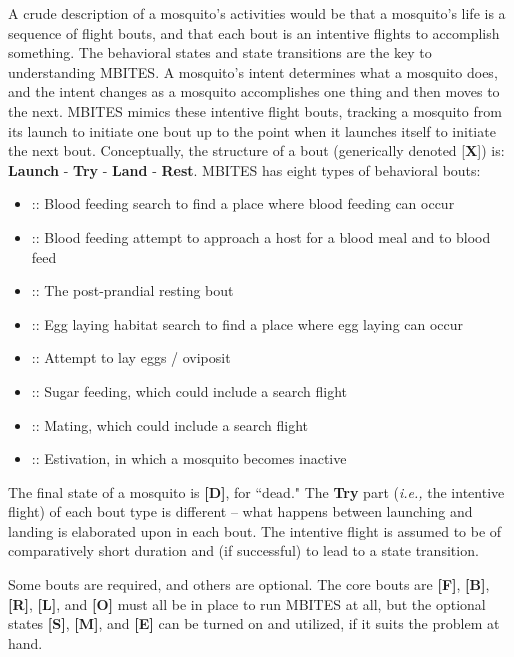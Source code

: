 \documentclass{article}
\newcommand{\ie}{{\em i.e., }}
\newcommand{\Bbout}{{\bf [B]}}
\newcommand{\Fbout}{{\bf [F]}}
\newcommand{\Rbout}{{\bf [R]}}
\newcommand{\Lbout}{{\bf [L]}}
\newcommand{\Obout}{{\bf [O]}}
\newcommand{\Sbout}{{\bf [S]}}
\newcommand{\Mbout}{{\bf [M]}}
\newcommand{\Ebout}{{\bf [E]}}
\newcommand{\Dead}{{\bf [D]}}
\begin{document}
A crude description of a mosquito's activities would be that a mosquito's life is a sequence of flight bouts, and that each bout is an intentive flights to accomplish something. The behavioral states and state transitions are the key to understanding MBITES. A mosquito's intent determines what a mosquito does, and the intent changes as a mosquito accomplishes one thing and then moves to the next. MBITES mimics these intentive flight bouts, tracking a  mosquito from its launch to initiate one bout up to the point when it launches itself to initiate the next bout. Conceptually, the structure of a bout (generically denoted [{\bf X}]) is:  {\bf Launch} - {\bf Try} - {\bf Land} - {\bf Rest}. MBITES has  eight types of behavioral bouts: 
\begin{itemize}
\item[\Fbout] :: Blood feeding search  to find a place where blood feeding can occur
\item[\Bbout] :: Blood feeding attempt to approach a host for a blood meal and to blood feed
\item[\Rbout] :: The post-prandial resting bout
\item[\Lbout] :: Egg laying habitat search to find a place where egg laying can occur
\item[\Obout] :: Attempt to lay eggs / oviposit 
\item[\Sbout] :: Sugar feeding, which could include a search flight 
\item[\Mbout] :: Mating, which could include a search flight 
\item[\Ebout] :: Estivation, in which a mosquito becomes inactive 
\end{itemize}
%
The final state of a mosquito is \Dead, for ``dead." The {\bf Try} part (\ie the intentive flight) of each bout type  is different -- what happens between launching and landing is elaborated upon in each bout. The intentive flight is assumed to be of comparatively short duration and (if successful) to lead to a state transition. 

Some bouts are required, and others are optional. The core bouts are \Fbout, \Bbout, \Rbout, \Lbout, and \Obout\; must all be in place to run MBITES at all, but the optional states \Sbout, \Mbout, and \Ebout\; can be turned on and utilized, if it suits the problem at hand.  
\end{document}
